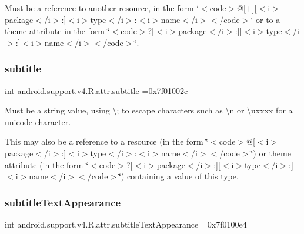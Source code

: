 Must be a reference to another resource, in the form \char`\"{}$<$code$>$@\mbox{[}+\mbox{]}\mbox{[}$<$i$>$package$<$/i$>$\+:\mbox{]}$<$i$>$type$<$/i$>$\+:$<$i$>$name$<$/i$>$$<$/code$>$\char`\"{} or to a theme attribute in the form \char`\"{}$<$code$>$?\mbox{[}$<$i$>$package$<$/i$>$\+:\mbox{]}\mbox{[}$<$i$>$type$<$/i$>$\+:\mbox{]}$<$i$>$name$<$/i$>$$<$/code$>$\char`\"{}. \mbox{\label{classandroid_1_1support_1_1v4_1_1R_1_1attr_a6a1cb8c7505d353bab12b766346b0219}} 
\subsubsection{\texorpdfstring{subtitle}{subtitle}}
{\footnotesize\ttfamily int android.\+support.\+v4.\+R.\+attr.\+subtitle =0x7f01002c\hspace{0.3cm}{\ttfamily [static]}}

Must be a string value, using \textquotesingle{}\textbackslash{};\textquotesingle{} to escape characters such as \textquotesingle{}\textbackslash{}n\textquotesingle{} or \textquotesingle{}\textbackslash{}uxxxx\textquotesingle{} for a unicode character. 

This may also be a reference to a resource (in the form \char`\"{}$<$code$>$@\mbox{[}$<$i$>$package$<$/i$>$\+:\mbox{]}$<$i$>$type$<$/i$>$\+:$<$i$>$name$<$/i$>$$<$/code$>$\char`\"{}) or theme attribute (in the form \char`\"{}$<$code$>$?\mbox{[}$<$i$>$package$<$/i$>$\+:\mbox{]}\mbox{[}$<$i$>$type$<$/i$>$\+:\mbox{]}$<$i$>$name$<$/i$>$$<$/code$>$\char`\"{}) containing a value of this type. \mbox{\label{classandroid_1_1support_1_1v4_1_1R_1_1attr_ae6695109829524a637cedde0ea0f40a1}} 
\subsubsection{\texorpdfstring{subtitle\+Text\+Appearance}{subtitleTextAppearance}}
{\footnotesize\ttfamily int android.\+support.\+v4.\+R.\+attr.\+subtitle\+Text\+Appearance =0x7f0100e4\hspace{0.3cm}{\ttfamily [static]}}

